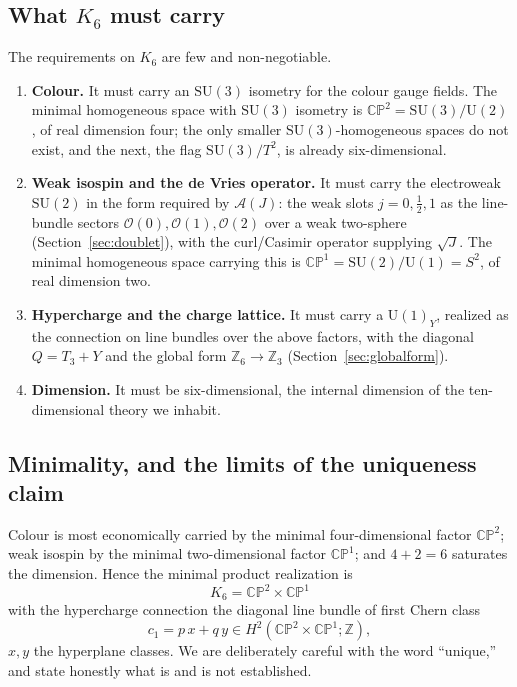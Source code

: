 \documentclass[11pt]{article}
\theoremstyle{plain}
\theoremstyle{definition}
\newcommand{\cA}{\mathcal{A}}
\newcommand{\cO}{\mathcal{O}}
\newcommand{\half}{\tfrac12}
\newcommand{\Z}{\mathbb{Z}}
\newcommand{\SU}{\mathrm{SU}}
\newcommand{\U}{\mathrm{U}}
\begin{document}
\subsection{What $K_6$ must carry}

The requirements on $K_6$ are few and non-negotiable.
\begin{enumerate}
\item \textbf{Colour.} It must carry an $\SU(3)$ isometry for the colour gauge
fields. The minimal homogeneous space with $\SU(3)$ isometry is
$\mathbb{CP}^2=\SU(3)/\U(2)$, of real dimension four; the only smaller
$\SU(3)$-homogeneous spaces do not exist, and the next, the flag
$\SU(3)/T^2$, is already six-dimensional.
\item \textbf{Weak isospin and the de Vries operator.} It must carry the
electroweak $\SU(2)$ in the form required by $\cA(J)$: the weak slots
$j=0,\half,1$ as the line-bundle sectors $\cO(0),\cO(1),\cO(2)$ over a weak
two-sphere (Section~\ref{sec:doublet}), with the curl/Casimir operator
supplying $\sqrt J$. The minimal homogeneous space carrying this is
$\mathbb{CP}^1=\SU(2)/\U(1)=S^2$, of real dimension two.
\item \textbf{Hypercharge and the charge lattice.} It must carry a $\U(1)_Y$,
realized as the connection on line bundles over the above factors, with the
diagonal $Q=T_3+Y$ and the global form $\Z_6\to\Z_3$
(Section~\ref{sec:globalform}).
\item \textbf{Dimension.} It must be six-dimensional, the internal dimension
of the ten-dimensional theory we inhabit.
\end{enumerate}

\subsection{Minimality, and the limits of the uniqueness claim}

Colour is most economically carried by the minimal four-dimensional factor
$\mathbb{CP}^2$; weak isospin by the minimal two-dimensional factor
$\mathbb{CP}^1$; and $4+2=6$ saturates the dimension. Hence the minimal
product realization is
\begin{equation}
\boxed{\;K_6=\mathbb{CP}^2\times\mathbb{CP}^1\;}
\label{eq:k6}
\end{equation}
with the hypercharge connection the diagonal line bundle of first Chern class
\begin{equation}
c_1=p\,x+q\,y\in H^2(\mathbb{CP}^2\times\mathbb{CP}^1;\Z),
\end{equation}
$x,y$ the hyperplane classes. We are deliberately careful with the word
``unique,'' and state honestly what is and is not established.
\end{document}
